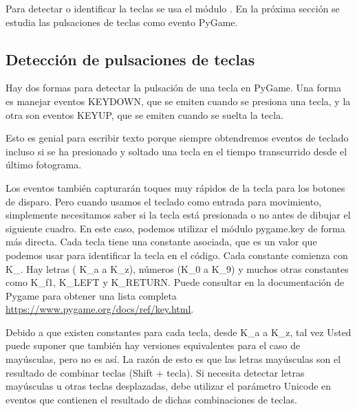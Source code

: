{Para detectar o identificar la teclas se usa el módulo . En la próxima sección se estudia las pulsaciones de teclas 
como  evento PyGame.


\subsection{Detección de pulsaciones de teclas}

Hay dos formas para detectar la pulsación de una tecla en PyGame. Una forma es manejar eventos {\ttfamily KEYDOWN}, que se emiten
cuando se presiona una tecla, y la otra son eventos  {\ttfamily KEYUP}, que se emiten cuando se suelta la tecla. 

Esto es genial para escribir texto porque siempre obtendremos eventos de teclado incluso si se ha presionado y 
soltado una tecla en el tiempo transcurrido desde el último fotograma. 

Los eventos también capturarán toques muy rápidos de la tecla para los botones de disparo. Pero cuando usamos el teclado
como entrada para movimiento, simplemente necesitamos saber si la tecla está presionada o no antes de dibujar el siguiente cuadro. 
En este caso, podemos utilizar el módulo {\ttfamily pygame.key} de forma más directa. Cada tecla tiene una constante asociada, que es un valor que podemos usar para identificar la tecla en el código. Cada constante comienza con {\ttfamily K\_}. Hay letras ( {\ttfamily K\_a} a   {\ttfamily K\_z}), números ({\ttfamily K\_0}  a {\ttfamily K\_9}) y muchos otras constantes como {\ttfamily K\_f1}, {\ttfamily K\_LEFT} y {\ttfamily K\_RETURN}. Puede consultar en la  documentación de Pygame para obtener una lista completa \href{https://www.pygame.org/docs/ref/key.html}{\color{vino} https://www.pygame.org/docs/ref/key.html}.

Debido a que existen constantes para cada tecla, desde {\ttfamily K\_a} a {\ttfamily K\_z}, tal vez Usted puede suponer que también 
hay versiones equivalentes para el caso de  mayúsculas, pero no es así. La razón de esto es que las letras mayúsculas son
el resultado de combinar teclas (Shift + tecla). Si necesita detectar letras mayúsculas u otras teclas desplazadas, debe  utilizar el
parámetro Unicode en eventos  que contienen el resultado de dichas combinaciones de teclas.\\

}
